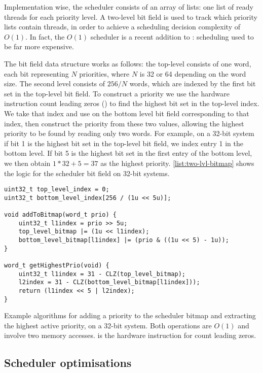 Implementation wise, the scheduler consists of an array of lists: one list of ready threads for each
priority level. A two-level bit field is used to track which priority lists contain threads, 
in order to achieve a scheduling decision complexity of $O(1)$. In fact, the \(O(1)\) scheduler is a
recent addition to \selfour: scheduling used to be far more expensive.

The bit field data structure works as follows: the
top-level consists of one word, each bit representing $N$ priorities, where $N$ is 32 or 64
depending on the word size. The second level consists of $256/N$ words, which are indexed by the first bit set in the
top-level bit field. To construct a priority we use the hardware instruction count leading zeros
() to find the highest bit set in the top-level index. We take that index and use
 on the bottom level bit field corresponding to that index, then construct the priority
from these two values, allowing the highest priority to be found by reading only two words. For
example, on a 32-bit system 
if bit 1 is the highest bit set in the top-level bit field, we index entry 1 in the
bottom level. If bit 5 is the highest bit set in the first entry of the bottom level, we then obtain
$1 * 32 + 5 = 37$ as the highest priority. 
\cref{list:two-lvl-bitmap} shows the logic for the scheduler bit field on 32-bit systems.

\begin{listing}
    \begin{verbatim}
uint32_t top_level_index = 0;
uint32_t bottom_level_index[256 / (1u << 5u)];

void addToBitmap(word_t prio) {
    uint32_t l1index = prio >> 5u;
    top_level_bitmap |= (1u << l1index);
    bottom_level_bitmap[l1index] |= (prio & ((1u << 5) - 1u));
}

word_t getHighestPrio(void) {
    uint32_t l1index = 31 - CLZ(top_level_bitmap);
    l2index = 31 - CLZ(bottom_level_bitmap[l1index]));
    return (l1index << 5 | l2index);
}
    \end{verbatim}
    \caption[Scheduler bitmap algorithm.]{Example algorithms for adding a priority to the scheduler bitmap and extracting the highest
        active priority, on a 32-bit system. Both operations are $O(1)$ and involve two memory
        accesses. 
     is the hardware instruction for count leading zeros.}
    \label{list:two-lvl-bitmap}
\end{listing}

\subsection{Scheduler optimisations}
\label{sec:sel4-scheduler-opt}

